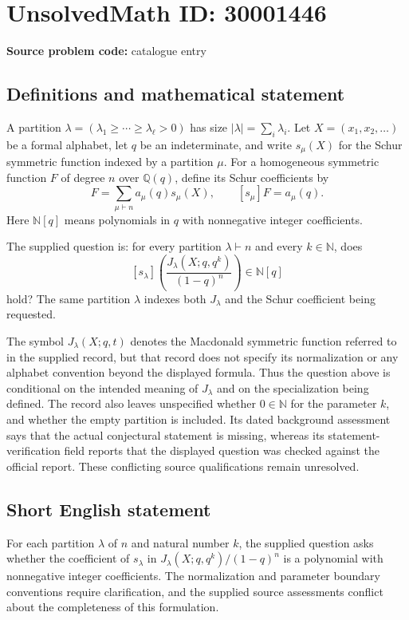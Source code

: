 \documentclass[11pt]{article}
\newcommand{\N}{\mathbb{N}}
\newcommand{\Q}{\mathbb{Q}}
\begin{document}
\section*{UnsolvedMath ID: 30001446}
\textbf{Source problem code:} catalogue entry
\subsection{Definitions and mathematical statement}
A partition \(\lambda=(\lambda_1\geq\cdots\geq\lambda_\ell>0)\) has size \(|\lambda|=\sum_i\lambda_i\). Let \(X=(x_1,x_2,\ldots)\) be a formal alphabet, let \(q\) be an indeterminate, and write \(s_\mu(X)\) for the Schur symmetric function indexed by a partition \(\mu\). For a homogeneous symmetric function \(F\) of degree \(n\) over \(\Q(q)\), define its Schur coefficients by
\[
F=\sum_{\mu\vdash n}a_\mu(q)s_\mu(X),\qquad [s_\mu]F=a_\mu(q).
\]
Here \(\N[q]\) means polynomials in \(q\) with nonnegative integer coefficients.

The supplied question is: for every partition \(\lambda\vdash n\) and every \(k\in\N\), does
\[
[s_\lambda]\!\left(\frac{J_\lambda(X;q,q^k)}{(1-q)^n}\right)\in\N[q]
\]
hold? The same partition \(\lambda\) indexes both \(J_\lambda\) and the Schur coefficient being requested.

The symbol \(J_\lambda(X;q,t)\) denotes the Macdonald symmetric function referred to in the supplied record, but that record does not specify its normalization or any alphabet convention beyond the displayed formula. Thus the question above is conditional on the intended meaning of \(J_\lambda\) and on the specialization being defined. The record also leaves unspecified whether \(0\in\N\) for the parameter \(k\), and whether the empty partition is included. Its dated background assessment says that the actual conjectural statement is missing, whereas its statement-verification field reports that the displayed question was checked against the official report. These conflicting source qualifications remain unresolved.
\subsection{Short English statement}
For each partition \(\lambda\) of \(n\) and natural number \(k\), the supplied question asks whether the coefficient of \(s_\lambda\) in \(J_\lambda(X;q,q^k)/(1-q)^n\) is a polynomial with nonnegative integer coefficients. The normalization and parameter boundary conventions require clarification, and the supplied source assessments conflict about the completeness of this formulation.
\end{document}
